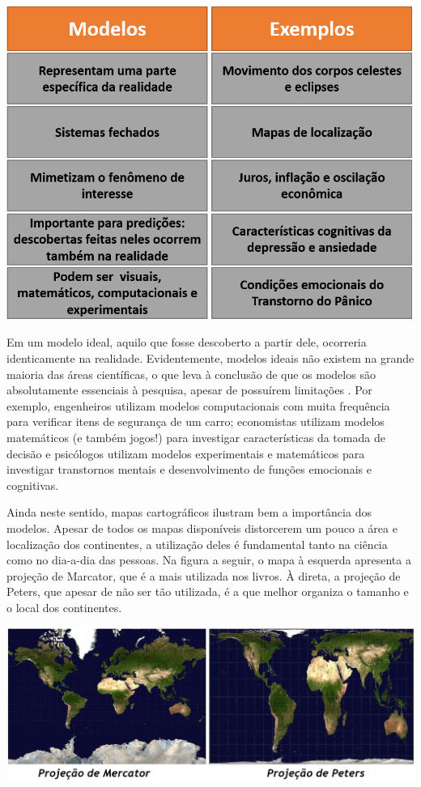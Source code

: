 \documentclass[
]{book}
\begin{document}
\includegraphics{./img/cap_modelos_cientificos.png}

Em um modelo ideal, aquilo que fosse descoberto a partir dele, ocorreria identicamente na realidade. Evidentemente, modelos ideais não existem na grande maioria das áreas científicas, o que leva à conclusão de que os modelos são absolutamente essenciais à pesquisa, apesar de possuírem limitações \citep{Putnam1980, Feigelson1992, Firgg2020}. Por exemplo, engenheiros utilizam modelos computacionais com muita frequência para verificar itens de segurança de um carro; economistas utilizam modelos matemáticos (e também jogos!) para investigar características da tomada de decisão e psicólogos utilizam modelos experimentais e matemáticos para investigar transtornos mentais e desenvolvimento de funções emocionais e cognitivas.

Ainda neste sentido, mapas cartográficos ilustram bem a importância dos modelos. Apesar de todos os mapas disponíveis distorcerem um pouco a área e localização dos continentes, a utilização deles é fundamental tanto na ciência como no dia-a-dia das pessoas. Na figura a seguir, o mapa à esquerda apresenta a projeção de Marcator, que é a mais utilizada nos livros. À direta, a projeção de Peters, que apesar de não ser tão utilizada, é a que melhor organiza o tamanho e o local dos continentes.

\includegraphics{./img/cap_mapas.png}
\end{document}
